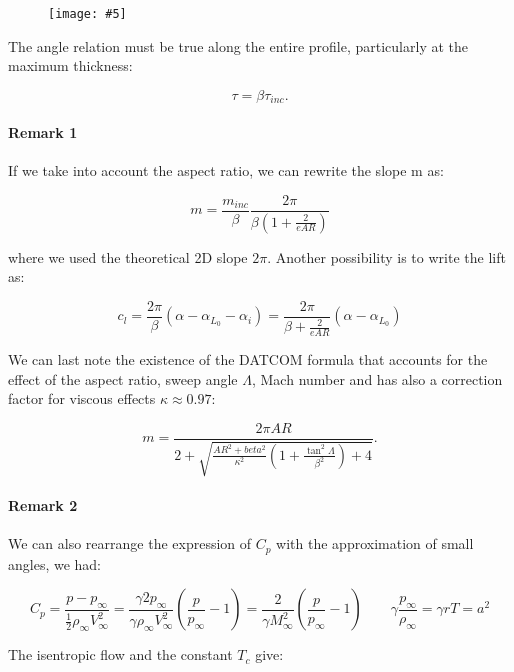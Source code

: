 \documentclass[british,french,11pt, a4paper, openany]{article}
\newcommand{\wrapfig}[6]{%
	\begin{figure}%
		\vspace{-5mm}%
		\texttt{[image: \#5]}%
		\captionof{figure}{}%
		\label{#6}%
	\end{figure}%
}
\begin{document}
\wrapfig{5}{l}{6.5}{0.1}{ch6/11}{fig:6.11}
The angle relation must be true along the entire profile, particularly at the maximum thickness: 

\begin{equation}
\tau = \beta \tau _{inc}. 
\end{equation}		

\paragraph{Remark 1}
If we take into account the aspect ratio, we can rewrite the slope m as: 

\begin{equation}
m = \frac{m_{inc}}{\beta} \frac{2\pi}{\beta \left(1+\frac{2}{eAR}\right)}
\end{equation}		

where we used the theoretical 2D slope $2\pi$. Another possibility is to write the lift as:

\begin{equation}
c_l = \frac{2\pi}{\beta} (\alpha - \alpha _{L_0} - \alpha _i) = \frac{2\pi}{\beta+\frac{2}{eAR}} (\alpha - \alpha _{L_0})
\end{equation}

We can	last note the existence of the DATCOM formula that accounts for the effect of the aspect ratio, sweep angle $\Lambda$, Mach number and has also a correction factor for viscous effects $\kappa \approx 0.97$: 

\begin{equation}
m = \frac{2\pi AR}{2+\sqrt{\frac{AR^2 + beta ^2}{\kappa ^2}\left( 1+\frac{\tan ^2\Lambda}{\beta ^2} \right)+4}}.
\end{equation}

\paragraph{Remark 2}
We can also rearrange the expression of $C_p$ with the approximation of small angles, we had: 

\begin{equation}
C_p = \frac{p-p_\infty}{\frac{1}{2}\rho _\infty V_\infty^2} = \frac{\gamma 2p_\infty}{\gamma \rho _\infty V_\infty ^2}\left(\frac{p}{p_\infty}-1 \right) =  \frac{2}{\gamma M^2_\infty} \left(\frac{p}{p_\infty} -1 \right) \qquad \gamma \frac{p_\infty}{\rho _\infty} = \gamma rT = a^2
\label{eq:6.23}
\end{equation}

The isentropic flow and the constant $T_c$ give: 
\end{document}
